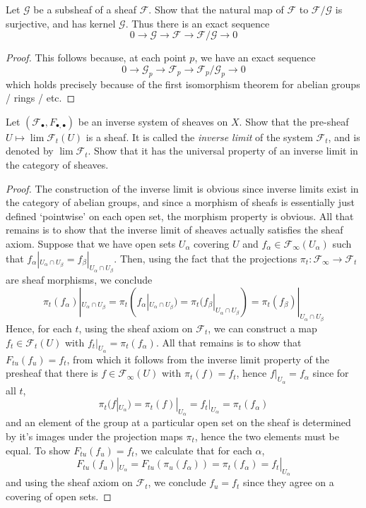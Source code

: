\begin{theorem}
    Let $\mathcal{G}$ be a subsheaf of a sheaf $\mathcal{F}$. Show that the natural map of $\mathcal{F}$ to $\mathcal{F}/\mathcal{G}$ is surjective, and has kernel $\mathcal{G}$. Thus there is an exact sequence
    \[ 0 \to \mathcal{G} \to \mathcal{F} \to \mathcal{F}/\mathcal{G} \to 0 \]
\end{theorem}
\begin{proof}
    This follows because, at each point $p$, we have an exact sequence
    \[ 0 \to \mathcal{G}_p \to \mathcal{F}_p \to \mathcal{F}_p/\mathcal{G}_p \to 0 \]
    which holds precisely because of the first isomorphism theorem for abelian groups / rings / etc.
\end{proof}

\begin{theorem}
    Let $(\mathcal{F}_\bullet, F_{\bullet, \bullet})$ be an inverse system of sheaves on $X$. Show that the pre-sheaf $U \mapsto \lim \mathcal{F}_t(U)$ is a sheaf. It is called the {\it inverse limit} of the system $\mathcal{F}_t$, and is denoted by $\lim \mathcal{F}_t$. Show that it has the universal property of an inverse limit in the category of sheaves.
\end{theorem}
\begin{proof}
    The construction of the inverse limit is obvious since inverse limits exist in the category of abelian groups, and since a morphism of sheafs is essentially just defined `pointwise' on each open set, the morphism property is obvious. All that remains is to show that the inverse limit of sheaves actually satisfies the sheaf axiom. Suppose that we have open sets $U_\alpha$ covering $U$ and $f_\alpha \in \mathcal{F}_\infty(U_\alpha)$ such that $f_\alpha|_{U_\alpha \cap U_\beta} = f_\beta|_{U_\alpha \cap U_\beta}$. Then, using the fact that the projections $\pi_t: \mathcal{F}_\infty \to \mathcal{F}_t$ are sheaf morphisms, we conclude
    \[ \pi_t(f_\alpha)|_{U_\alpha \cap U_\beta} = \pi_t(f_\alpha|_{U_\alpha \cap U_\beta}) = \pi_t(f_\beta|_{U_\alpha \cap U_\beta}) = \pi_t(f_\beta)|_{U_\alpha \cap U_\beta} \]
    Hence, for each $t$, using the sheaf axiom on $\mathcal{F}_t$, we can construct a map $f_t \in \mathcal{F}_t(U)$ with $f_t|_{U_\alpha} = \pi_t(f_\alpha)$. All that remains is to show that $F_{tu}(f_u) = f_t$, from which it follows from the inverse limit property of the presheaf that there is $f \in \mathcal{F}_\infty(U)$ with $\pi_t(f) = f_t$, hence $f|_{U_\alpha} = f_\alpha$ since for all $t$,
    \[ \pi_t(f|_{U_\alpha}) = \pi_t(f)|_{U_\alpha} = f_t|_{U_\alpha} = \pi_t(f_\alpha) \]
    and an element of the group at a particular open set on the sheaf is determined by it's images under the projection maps $\pi_t$, hence the two elements must be equal. To show $F_{tu}(f_u) = f_t$, we calculate that for each $\alpha$,
    \[ F_{tu}(f_u)|_{U_\alpha} = F_{tu}(\pi_u(f_\alpha)) = \pi_t(f_\alpha) = f_t|_{U_\alpha} \]
    and using the sheaf axiom on $\mathcal{F}_t$, we conclude $f_u = f_t$ since they agree on a covering of open sets.
\end{proof}

